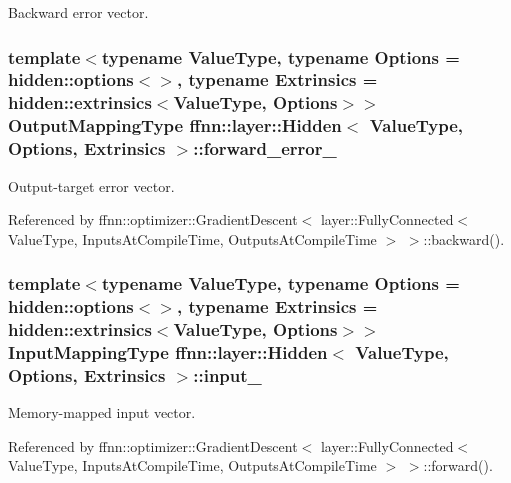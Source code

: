 Backward error vector. 

\hypertarget{classffnn_1_1layer_1_1_hidden_a1abba7440bdde56f49673de2acf58b30}{
\subsubsection[{forward\-\_\-error\-\_\-}]{\setlength{\rightskip}{0pt plus 5cm}template$<$typename Value\-Type, typename Options = hidden\-::options$<$$>$, typename Extrinsics = hidden\-::extrinsics$<$\-Value\-Type, Options$>$$>$ {\bf Output\-Mapping\-Type} {\bf ffnn\-::layer\-::\-Hidden}$<$ Value\-Type, Options, Extrinsics $>$\-::forward\-\_\-error\-\_\-\hspace{0.3cm}{\ttfamily [protected]}}}\label{classffnn_1_1layer_1_1_hidden_a1abba7440bdde56f49673de2acf58b30}


Output-\/target error vector. 



Referenced by ffnn\-::optimizer\-::\-Gradient\-Descent$<$ layer\-::\-Fully\-Connected$<$ Value\-Type, Inputs\-At\-Compile\-Time, Outputs\-At\-Compile\-Time $>$ $>$\-::backward().

\hypertarget{classffnn_1_1layer_1_1_hidden_afe2644f671f711cf0ca1357621dfc3a6}{
\subsubsection[{input\-\_\-}]{\setlength{\rightskip}{0pt plus 5cm}template$<$typename Value\-Type, typename Options = hidden\-::options$<$$>$, typename Extrinsics = hidden\-::extrinsics$<$\-Value\-Type, Options$>$$>$ {\bf Input\-Mapping\-Type} {\bf ffnn\-::layer\-::\-Hidden}$<$ Value\-Type, Options, Extrinsics $>$\-::input\-\_\-\hspace{0.3cm}{\ttfamily [protected]}}}\label{classffnn_1_1layer_1_1_hidden_afe2644f671f711cf0ca1357621dfc3a6}


Memory-\/mapped input vector. 



Referenced by ffnn\-::optimizer\-::\-Gradient\-Descent$<$ layer\-::\-Fully\-Connected$<$ Value\-Type, Inputs\-At\-Compile\-Time, Outputs\-At\-Compile\-Time $>$ $>$\-::forward().

